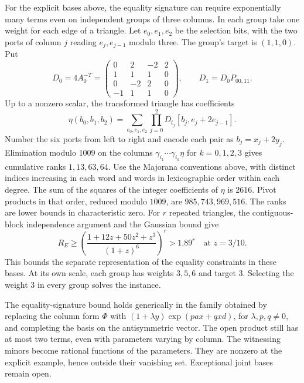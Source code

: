 \documentclass[11pt,a4paper]{article}
\numberwithin{equation}{section}
\begin{document}
For the explicit bases above, the equality signature can require exponentially many terms even on independent groups of three columns. In each group take one weight for each edge of a triangle. Let \(e_0,e_1,e_2\) be the selection bits, with the two ports of column \(j\) reading \(e_j,e_{j-1}\) modulo three. The group's target is \((1,1,0)\). Put
\begin{equation}\label{eq:dual-bases}
D_0=4A_0^{-T}=\begin{pmatrix}
0&2&-2&2\\
1&1&1&0\\
0&-2&2&0\\
-1&1&1&0
\end{pmatrix},
\qquad D_1=D_0P_{00,11}.
\end{equation}
Up to a nonzero scalar, the transformed triangle has coefficients
\begin{equation}\label{eq:triangle-equality}
\eta(b_0,b_1,b_2)
=\sum_{e_0,e_1,e_2}\prod_{j=0}^2
 D_{t_j}[b_j,e_j+2e_{j-1}] .
\end{equation}
Number the six ports from left to right and encode each pair as \(b_j=x_j+2y_j\). Elimination modulo \(1009\) on the columns \(\gamma_{i_1}\cdots\gamma_{i_k}\eta\) for \(k=0,1,2,3\) gives cumulative ranks \(1,13,63,64\). Use the Majorana conventions above, with distinct indices increasing in each word and words in lexicographic order within each degree. The sum of the squares of the integer coefficients of \(\eta\) is \(2616\). Pivot products in that order, reduced modulo \(1009\), are \(985,743,969,516\). The ranks are lower bounds in characteristic zero. For \(r\) repeated triangles, the contiguous-block independence argument and the Gaussian bound give
\begin{equation}\label{eq:dual-rank-bound}
R_E\ge \left(\frac{1+12z+50z^2+z^3}{(1+z)^6}\right)^r > 1.89^r
\quad\text{at }z=3/10 .
\end{equation}
This bounds the separate representation of the equality constraints in these bases. At its own scale, each group has weights \(3,5,6\) and target \(3\). Selecting the weight \(3\) in every group solves the instance.

The equality-signature bound holds generically in the family obtained by replacing the column form \(\Phi\) with \((1+\lambda y)\exp(pax+qxd)\), for \(\lambda,p,q\ne0\), and completing the basis on the antisymmetric vector. The open product still has at most two terms, even with parameters varying by column. The witnessing minors become rational functions of the parameters. They are nonzero at the explicit example, hence outside their vanishing set. Exceptional joint bases remain open.
\end{document}
